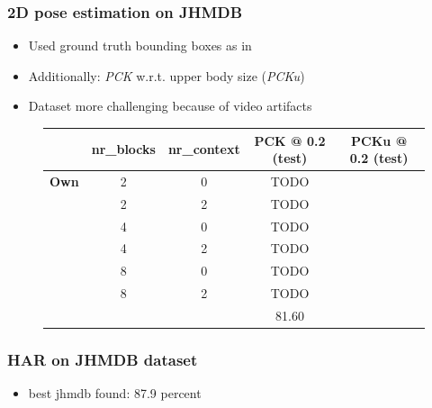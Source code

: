 \documentclass[9pt]{beamer}
\newenvironment{myframe}[1][]{%
\begin{frame}%
\frametitle{#1}
\setcounter{footnote}{0}


}{%
\end{frame}%
}
\begin{document}
\begin{myframe}[2D pose estimation on JHMDB]
    \begin{itemize}
        \item Used ground truth bounding boxes as in \footnotemark
        \item Additionally: \textit{PCK} w.r.t. upper body size (\textit{PCKu})
        \item Dataset more challenging because of video artifacts
    \end{itemize}
    \begin{figure}
        \begin{table}[]
            \small
            \begin{tabular}{|l|c|c|c|c|}
            \hline
             & \textbf{nr\_blocks} & \textbf{nr\_context} & \textbf{PCK @ 0.2 (test)} & \textbf{PCKu @ 0.2 (test)} \\ \hline
            \textbf{Own} & 2 & 0 & TODO &  \\
            \textbf{} & 2 & 2 & TODO &  \\
            \textbf{} & 4 & 0 & TODO &  \\
            \textbf{} & 4 & 2 & TODO &  \\
            \textbf{} & 8 & 0 & TODO &  \\
            \textbf{} & 8 & 2 & TODO &  \\ \hline
            \textbf{\footnotemark} &  &  & 81.60 &  \\ \hline
            \end{tabular}
        \end{table}
    \end{figure}
\end{myframe}

\begin{myframe}[HAR on JHMDB dataset]
    \begin{itemize}
        \item best jhmdb found: 87.9 percent \footnotemark
    \end{itemize}
\end{myframe}
\end{document}
